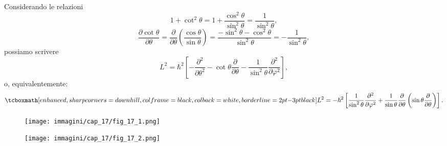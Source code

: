 Considerando le relazioni
	\begin{equation}
		1+ \cot ^2 \theta = 1+\frac{\cos ^2 \theta}{\sin ^2 \theta} = \frac{1}{\sin ^2 \theta},
	\end{equation}
	\begin{equation}
		\frac{\partial \cot \theta}{\partial \theta}= \frac{\partial}{\partial \theta}\left( \frac{\cos  \theta}{\sin \theta} \right) = \frac{-\sin ^ 2 \theta - \cos ^2 \theta}{\sin ^2 \theta}=-\frac{1}{\sin ^2 \theta},
	\end{equation}
possiamo scrivere
	\begin{equation}
		L^2 = \hbar ^2 \left[- \frac{\partial ^2}{\partial \theta ^2}-\cot \theta \frac{\partial}{\partial \theta}- \frac{1}{\sin ^2 \theta}\frac{\partial ^2}{\partial \varphi ^2}\right] ,
	\end{equation}
o, equivalentemente:
	\begin{equation}
		\tcboxmath[enhanced, sharp corners=downhill, colframe=black, colback=white, borderline={2pt}{-3pt}{black}]{
			L^2 = -\hbar ^2 \left[\frac{1}{\sin ^2 \theta}\frac{\partial ^2}{\partial \varphi ^2}+\frac{1}{\sin \theta}\frac{\partial}{\partial \theta} \left(\sin \theta \frac{\partial}{\partial \theta}\right)\right] .
			}
	\end{equation}
\newpage
\begin{figure}[!htbp]
\begin{center}
\texttt{[image: immagini/cap\_17/fig\_17\_1.png]}\\
\end{center}
\end{figure}
\begin{figure}[!htbp]
\begin{center}
\texttt{[image: immagini/cap\_17/fig\_17\_2.png]}\\
\end{center}
\end{figure}
